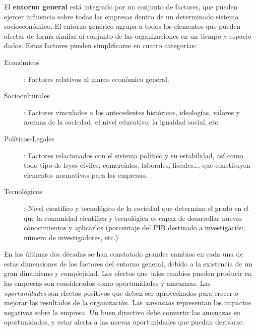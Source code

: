 \documentclass[10pt,a4paper,spanish]{report}
\begin{document}
        El \textbf{entorno general} está integrado por un conjunto de factores, que pueden ejercer influencia sobre todas las empresas dentro de un determinado sistema socioeconómico. El entorno genérico agrupa a todos los elementos que pueden afectar de forma similar al conjunto de las organizaciones en un tiempo y espacio dados. Estos factores pueden simplificarse en cuatro categorías:
            \begin{description}
                  \item[Económicos]: Factores relativos al marco económico general.
                  \item[Socioculturales]: Factores vinculados a los antecedentes históricos, ideologías, valores y normas de la sociedad, el nivel educativo, la igualdad social, etc.
                  \item[Políticos-Legales]: Factores relacionados con el sistema político y su estabilidad, así como todo tipo de leyes civiles, comerciales, laborales, fiscales\ldots, que constituyen elementos normativos para las empresas.
                  \item[Tecnológicos]: Nivel científico y tecnológico de la sociedad que determina el grado en el que la comunidad científica y tecnológica es capaz de desarrollar nuevos conocimientos y aplicarlos (porcentaje del PIB destinado a investigación, número de investigadores, etc.)
            \end{description}

            En las últimas dos décadas se han constatado grandes cambios en cada una de estas dimensiones de los factores del entorno general, debido a la existencia de un gran dinamismo y complejidad. Los efectos que tales cambios pueden producir en las empresas son considerados como oportunidades y amenazas. Las \textit{\textcolor[rgb]{0.3,0.4,0.6}{oportunidades}} son efectos positivos que deben ser aprovechados para crecer o mejorar los resultados de la organización. Las \textit{\textcolor[rgb]{0.3,0.4,0.6}{amenazas}} representan los impactos negativos sobre la empresa. Un buen directivo debe convertir las amenazas en oportunidades, y estar alerta a las nuevas oportunidades que puedan derivarse.
\end{document}
